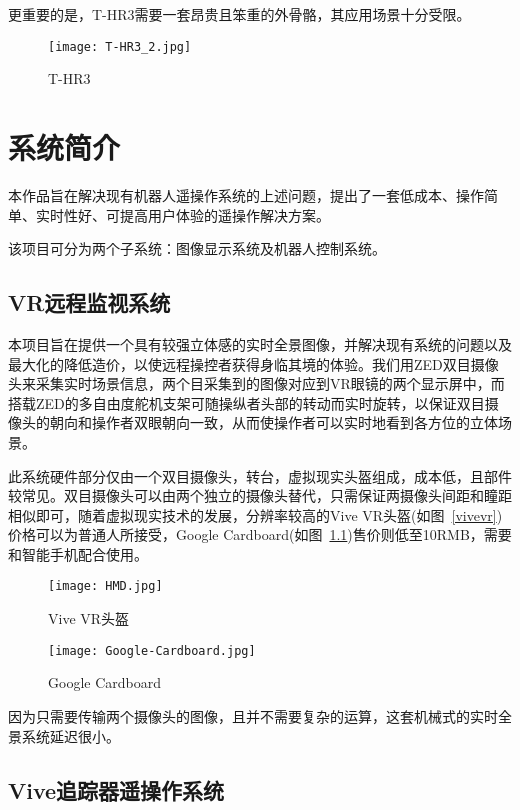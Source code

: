 更重要的是，T-HR3需要一套昂贵且笨重的外骨骼，其应用场景十分受限。

\begin{figure}[htbp]
\small
\centering
\texttt{[image: T-HR3\_2.jpg]}
\caption{T-HR3} 
\label{thr}
\end{figure}




\chapter{系统简介}

本作品旨在解决现有机器人遥操作系统的上述问题，提出了一套低成本、操作简单、实时性好、可提高用户体验的遥操作解决方案。


该项目可分为两个子系统：图像显示系统及机器人控制系统。
	
	\section{VR远程监视系统}
本项目旨在提供一个具有较强立体感的实时全景图像，并解决现有系统的问题以及最大化的降低造价，以使远程操控者获得身临其境的体验。我们用ZED双目摄像头来采集实时场景信息，两个目采集到的图像对应到VR眼镜的两个显示屏中，而搭载ZED的多自由度舵机支架可随操纵者头部的转动而实时旋转，以保证双目摄像头的朝向和操作者双眼朝向一致，从而使操作者可以实时地看到各方位的立体场景。
	
此系统硬件部分仅由一个双目摄像头，转台，虚拟现实头盔组成，成本低，且部件较常见。双目摄像头可以由两个独立的摄像头替代，只需保证两摄像头间距和瞳距相似即可，随着虚拟现实技术的发展，分辨率较高的Vive VR头盔(如图~\ref{vivevr})价格可以为普通人所接受，Google Cardboard(如图~\ref{card})售价则低至10RMB，需要和智能手机配合使用。
\begin{figure}
\begin{minipage}{0.48\textwidth}
  \centering
  \texttt{[image: HMD.jpg]}
  \caption{Vive VR头盔}
  \label{vivevr}
\end{minipage}\hfill
\begin{minipage}{0.48\textwidth}
  \centering
  \texttt{[image: Google-Cardboard.jpg]}
  \caption{Google Cardboard}
  \label{card}
\end{minipage}
\end{figure}

因为只需要传输两个摄像头的图像，且并不需要复杂的运算，这套机械式的实时全景系统延迟很小。

\section{Vive追踪器遥操作系统}

